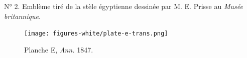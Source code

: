 \documentclass[a4paper, 11pt, oneside, polutonikogreek, french]{article}
\begin{document}
N° 2. Emblème tiré de la stèle égyptienne dessinée par M. E. Prisse au \emph{Musée britannique}.
\vspace*{\fill}
\clearpage
\pagestyle{fancy}
\fancyhf{}
\cfoot{{\tiny\bfseries\thepage}}
\vspace*{\fill}
\begin{figure}[H]
\centering
\texttt{[image: figures-white/plate-e-trans.png]}
\caption{\scriptsize Planche E, \emph{Ann.} 1847.}
\end{figure}
\vspace*{\fill}
\clearpage
\end{document}
